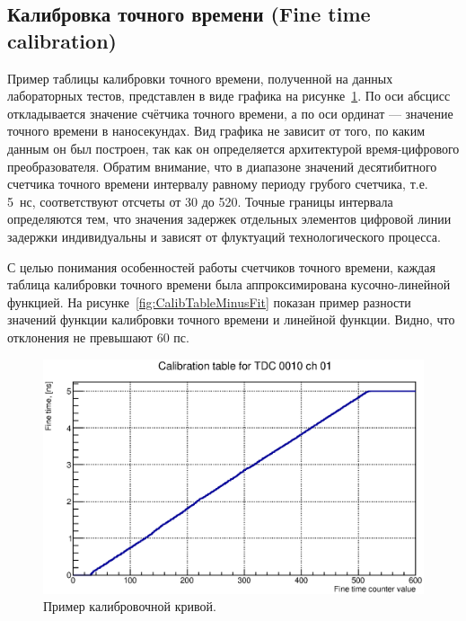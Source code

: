 \subsection{Калибровка точного времени (Fine time calibration)}\label{section:FTcalib}

Пример таблицы калибровки точного времени, полученной на данных лабораторных тестов, представлен в виде графика на рисунке~\ref{fig:TypicalCalibTable}. По оси абсцисс откладывается значение счётчика точного времени, а по оси ординат --- значение точного времени в наносекундах. Вид графика не зависит от того, по каким данным он был построен, так как он определяется архитектурой время-цифрового преобразователя. Обратим внимание, что в диапазоне значений десятибитного счетчика точного времени интервалу равному периоду грубого счетчика, т.е. 5~нс, соответствуют отсчеты от 30 до 520. Точные границы интервала определяются тем, что значения задержек отдельных элементов цифровой линии задержки индивидуальны и зависят от флуктуаций технологического процесса.

С целью понимания особенностей работы счетчиков точного времени, каждая таблица калибровки точного времени была аппроксимирована кусочно-линейной функцией. На рисунке~\ref{fig:CalibTableMinusFit} показан пример разности значений функции калибровки точного времени и линейной функции. Видно, что отклонения не превышают 60 пс.

\begin{figure}
\includegraphics[width=1.0\textwidth]{pictures/CalTable_0010_01.eps}
\caption{Пример калибровочной кривой.}
\label{fig:TypicalCalibTable}
\end{figure}

